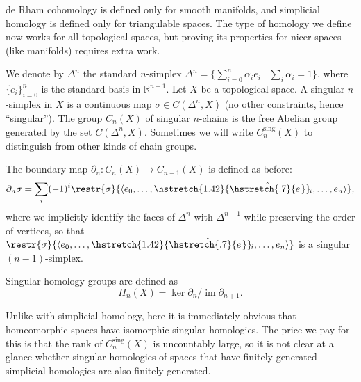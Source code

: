 \documentclass[english,letterpaper]{article}%
\numberwithin{equation}{section}
\numberwithin{figure}{section}
\numberwithin{table}{section}
\theoremstyle{definition}
\theoremstyle{definition}
\theoremstyle{definition}
\theoremstyle{plain}
\theoremstyle{plain}
\theoremstyle{plain}
\theoremstyle{plain}
\theoremstyle{remark}
\theoremstyle{remark}
\newcommand{\bbR}{\mathbb{R}}
\DeclareMathOperator{\im}{im}
\newcommand\wh[1]{\hstretch{1.42}{\hat{\hstretch{.7}{#1\mkern2mu}}}\mkern-2mu} %
\begin{document}
de Rham cohomology is defined only for smooth manifolds, and simplicial homology is defined only for triangulable spaces. The type of homology we define now works for all topological spaces, but proving its properties for nicer spaces (like manifolds) requires extra work. 

\begin{defn}
    We denote by $\Delta^n$ the standard $n$-simplex $\Delta^n=\{\sum_{i=0}^{n} \alpha_i e_i\mid \sum_i\alpha_i=1\}$, where $\{e_i\}_{i=0}^{n}$ is the standard basis in $\bbR^{n+1}$. Let $X$ be a topological space. A singular $n$-simplex in $X$ is a continuous map $\sigma\in C(\Delta^n, X)$ (no other constraints, hence ``singular''). The group $C_n(X)$ of singular $n$-chains is the free Abelian group generated by the set $C(\Delta^n,X)$. Sometimes we will write $C^{\text{sing}}_n(X)$ to distinguish from other kinds of chain groups.
\end{defn}
\begin{defn}
    The boundary map $\partial_n:C_n(X)\to C_{n-1}(X)$ is defined as before:
    \[\partial_n\sigma=\sum_i (-1)^i\restr{\sigma}{\langle e_0,\ldots,\wh{e}_i,\ldots,e_n\rangle},\]
    where we implicitly identify the faces of $\Delta^n$ with $\Delta^{n-1}$ while preserving the order of vertices, so that $\restr{\sigma}{\langle e_0,\ldots,\wh{e}_i,\ldots,e_n\rangle}$ is a singular $(n-1)$-simplex.
    
    Singular homology groups are defined as
    \[H_n(X)=\ker\partial_n/\im\partial_{n+1}.\]
\end{defn}

Unlike with simplicial homology, here it is immediately obvious that homeomorphic spaces have isomorphic singular homologies. The price we pay for this is that the rank of $C^{\text{sing}}_n(X)$ is uncountably large, so it is not clear at a glance whether singular homologies of spaces that have finitely generated simplicial homologies are also finitely generated. 
\end{document}
